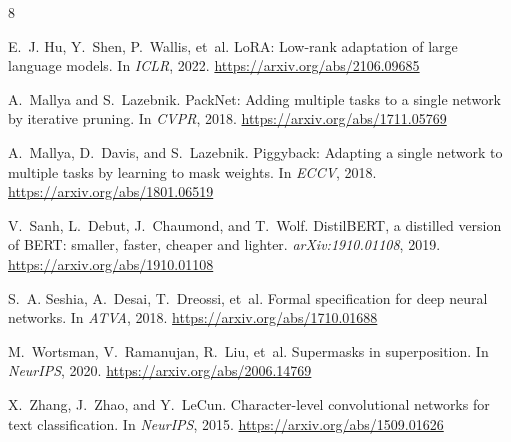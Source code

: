 \documentclass[11pt]{article}
\begin{document}
\small

\begin{thebibliography}{8}

E.~J. Hu, Y.~Shen, P.~Wallis, et~al.
\newblock LoRA: Low-rank adaptation of large language models.
\newblock In \emph{ICLR}, 2022.
\newblock \url{https://arxiv.org/abs/2106.09685}

A.~Mallya and S.~Lazebnik.
\newblock PackNet: Adding multiple tasks to a single network by iterative pruning.
\newblock In \emph{CVPR}, 2018.
\newblock \url{https://arxiv.org/abs/1711.05769}

A.~Mallya, D.~Davis, and S.~Lazebnik.
\newblock Piggyback: Adapting a single network to multiple tasks by learning to mask weights.
\newblock In \emph{ECCV}, 2018.
\newblock \url{https://arxiv.org/abs/1801.06519}

V.~Sanh, L.~Debut, J.~Chaumond, and T.~Wolf.
\newblock DistilBERT, a distilled version of BERT: smaller, faster, cheaper and lighter.
\newblock \emph{arXiv:1910.01108}, 2019.
\newblock \url{https://arxiv.org/abs/1910.01108}

S.~A. Seshia, A.~Desai, T.~Dreossi, et~al.
\newblock Formal specification for deep neural networks.
\newblock In \emph{ATVA}, 2018.
\newblock \url{https://arxiv.org/abs/1710.01688}

M.~Wortsman, V.~Ramanujan, R.~Liu, et~al.
\newblock Supermasks in superposition.
\newblock In \emph{NeurIPS}, 2020.
\newblock \url{https://arxiv.org/abs/2006.14769}

X.~Zhang, J.~Zhao, and Y.~LeCun.
\newblock Character-level convolutional networks for text classification.
\newblock In \emph{NeurIPS}, 2015.
\newblock \url{https://arxiv.org/abs/1509.01626}

\end{thebibliography}
\end{document}

